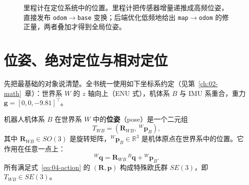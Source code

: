 \begin{figure}[htbp]
  \centering
  \caption{里程计在定位系统中的位置。里程计把传感器增量递推成高频位姿，直接发布 \texttt{odom}$\to$\texttt{base} 变换；后端优化低频地给出 \texttt{map}$\to$\texttt{odom} 的修正量，两者叠加才得到全局位姿。}
  \label{fig:04-system}
\end{figure}

\section{位姿、绝对定位与相对定位}\label{sec:04-pose}

先把最基础的对象说清楚。全书统一使用如下坐标系约定（见第~\ref{ch:02-math}~章）：世界系 $W$ 的 $z$ 轴向上（ENU 式），机体系 $B$ 与 IMU 系重合，重力 $\bm{g}=[0,0,-9.81]^{\top}$。

\begin{definition}[位姿]
机器人机体系 $B$ 在世界系 $W$ 中的\textbf{位姿}（pose）是一个二元组
\begin{equation}
  T_{WB} = \left(\bm{R}_{WB},\ {}^{W}\bm{p}_{B}\right),
  \label{eq:04-pose}
\end{equation}
其中 $\bm{R}_{WB}\in SO(3)$ 是旋转矩阵，${}^{W}\bm{p}_{B}\in\mathbb{R}^{3}$ 是机体原点在世界系中的位置。它作用在任意一点上：
\begin{equation}
  {}^{W}\bm{q} = \bm{R}_{WB}\,{}^{B}\bm{q} + {}^{W}\bm{p}_{B}.
  \label{eq:04-action}
\end{equation}
所有满足式~\eqref{eq:04-action} 的 $(\bm{R},\bm{p})$ 构成特殊欧氏群 $SE(3)$，即 $T_{WB}\in SE(3)$。
\end{definition}

